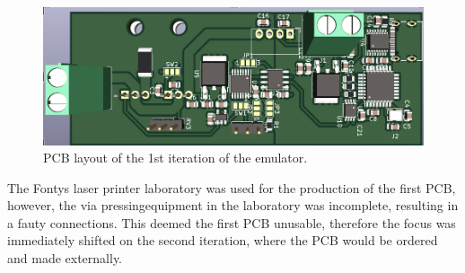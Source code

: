 \begin{figure}[h]
    \centering
    \includegraphics[scale=0.45]{pcb_1st_iteration.png}
    \caption{PCB layout of the 1st iteration of the emulator.}
    \label{fig:1st_pcb}
\end{figure}

The Fontys laser printer laboratory was used for the production 
of the first PCB, however, the via pressingequipment in the 
laboratory was incomplete, resulting in a fauty connections. 
This deemed the first PCB unusable, therefore the focus was 
immediately shifted on the second iteration, where the PCB 
would be ordered and made externally.
